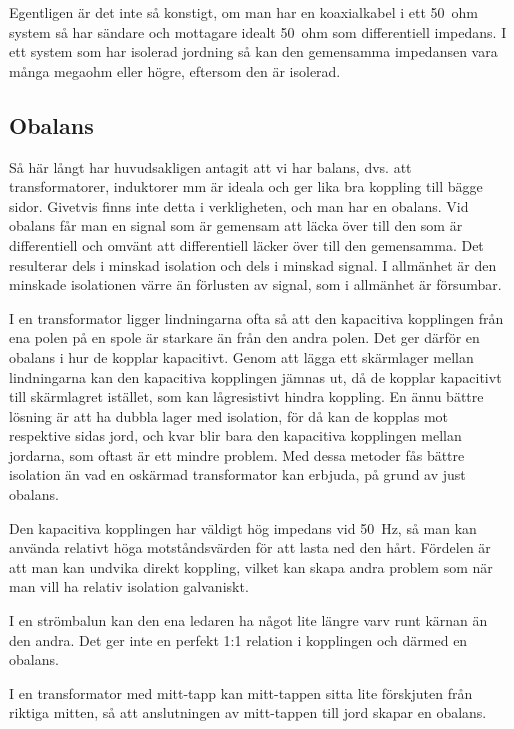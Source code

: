 Egentligen är det inte så konstigt, om man har en koaxialkabel i ett 50~ohm
system så har sändare och mottagare idealt 50~ohm som differentiell impedans.
I ett system som har isolerad jordning så kan den gemensamma impedansen vara
många megaohm eller högre, eftersom den är isolerad.

\subsection{Obalans}

Så här långt har huvudsakligen antagit att vi har balans, dvs. att
transformatorer, induktorer mm är ideala och ger lika bra koppling till bägge
sidor.
Givetvis finns inte detta i verkligheten, och man har en obalans.
Vid obalans får man en signal som är gemensam att läcka över till den som är
differentiell och omvänt att differentiell läcker över till den gemensamma.
Det resulterar dels i minskad isolation och dels i minskad signal.
I allmänhet är den minskade isolationen värre än förlusten av signal, som i
allmänhet är försumbar.

I en transformator ligger lindningarna ofta så att den kapacitiva kopplingen
från ena polen på en spole är starkare än från den andra polen.
Det ger därför en obalans i hur de kopplar kapacitivt.
Genom att lägga ett skärmlager mellan lindningarna kan den kapacitiva
kopplingen jämnas ut, då de kopplar kapacitivt till skärmlagret istället,
som kan lågresistivt hindra koppling.
En ännu bättre lösning är att ha dubbla lager med isolation, för då
kan de kopplas mot respektive sidas jord, och kvar blir bara den kapacitiva
kopplingen mellan jordarna, som oftast är ett mindre problem.
Med dessa metoder fås bättre isolation än vad en oskärmad transformator kan
erbjuda, på grund av just obalans.

Den kapacitiva kopplingen har väldigt hög impedans vid 50~Hz, så man kan
använda relativt höga motståndsvärden för att lasta ned den hårt.
Fördelen är att man kan undvika direkt koppling, vilket kan skapa andra
problem som när man vill ha relativ isolation galvaniskt.

I en strömbalun kan den ena ledaren ha något lite längre varv runt kärnan än
den andra.
Det ger inte en perfekt 1:1 relation i kopplingen och därmed en obalans.

I en transformator med mitt-tapp kan mitt-tappen sitta lite förskjuten från
riktiga mitten, så att anslutningen av mitt-tappen till jord skapar en
obalans.

